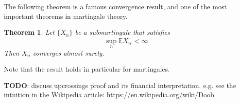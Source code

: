 \documentclass[12pt]{article}
\newcommand{\E}{\mathbb{E}}
\newtheorem{thm}{Theorem}
\begin{document}
The following theorem is a famous convergence result, and one of the most important theorems in martingale theory. 
\begin{thm}
Let $\{X_n\}$ be a submartingale that satisfies 
\[\sup_n \E X_n^+ < \infty\]
Then $X_n$ converges almost surely. 
\end{thm}
Note that the result holds in particular for martingales. 

\bigskip
\textbf{TODO}: discuss upcrossings proof and its financial interpretation. e.g. see the intuition in the Wikipedia article:
https://en.wikipedia.org/wiki/Doob%
\end{document}
